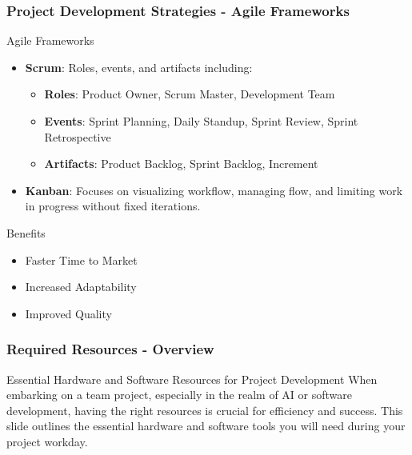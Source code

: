 \documentclass{beamer}
\begin{document}
\begin{frame}[fragile]
    \frametitle{Project Development Strategies - Agile Frameworks}
    \begin{block}{Agile Frameworks}
        \begin{itemize}
            \item \textbf{Scrum}: Roles, events, and artifacts including:
                \begin{itemize}
                    \item \textbf{Roles}: Product Owner, Scrum Master, Development Team
                    \item \textbf{Events}: Sprint Planning, Daily Standup, Sprint Review, Sprint Retrospective
                    \item \textbf{Artifacts}: Product Backlog, Sprint Backlog, Increment
                \end{itemize}
            \item \textbf{Kanban}: Focuses on visualizing workflow, managing flow, and limiting work in progress without fixed iterations.
        \end{itemize}
    \end{block}

    \begin{block}{Benefits}
        \begin{itemize}
            \item Faster Time to Market
            \item Increased Adaptability
            \item Improved Quality
        \end{itemize}
    \end{block}
\end{frame}

\begin{frame}[fragile]
    \frametitle{Required Resources - Overview}
    \begin{block}{Essential Hardware and Software Resources for Project Development}
        When embarking on a team project, especially in the realm of AI or software development, having the right resources is crucial for efficiency and success. This slide outlines the essential hardware and software tools you will need during your project workday.
    \end{block}
\end{frame}
\end{document}
